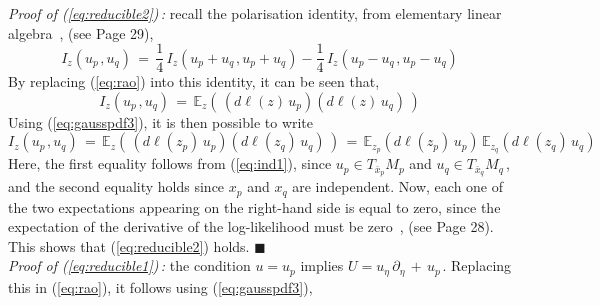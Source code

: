 \documentclass{svmult}
\begin{document}
\textit{Proof of (\ref{eq:reducible2})\,:} recall the polarisation identity, from elementary linear algebra~\cite{lang}, (see Page 29),
$$
I_z(u_{p\,},u_q) \,=\, \frac{1}{4}\,I_z(u_p+u_{q\,},u_p+u_q) -  \frac{1}{4}\,I_z(u_p-u_{q\,},u_p-u_{q})
$$
By replacing (\ref{eq:rao}) into this identity, it can be seen that,
\begin{equation} \label{eq:ind1}
I_z(u_{p\,},u_q) \,=\, \mathbb{E}_z\left(\,\left(d\ell(z)\,u_p\right)\left(d\ell(z)\,u_q\right)\,\right)
\end{equation}
Using (\ref{eq:gausspdf3}), it is then possible to write
$$
I_z(u_{p\,},u_q) \,=\, 
\mathbb{E}_z\left(\,\left(d\ell(z_p)\,u_p\right)\left(d\ell(z_q)\,u_q\right)\,\right) \,=\, \mathbb{E}_{z_p}\left(d\ell(z_p)\,u_p\right)\,
\mathbb{E}_{z_q}\left(d\ell(z_q)\,u_q\right)
$$
Here, the first equality follows from (\ref{eq:ind1}), since $u_p \in T_{\bar{x}_p}M_p$ and $u_q \in T_{\bar{x}_q}M_q\,$, and the second equality holds since $x_p$ and $x_q$ are independent. Now, each one of the two expectations appearing on the right-hand side is equal to zero, since the expectation of the derivative of the log-likelihood must be zero~\cite{amari}, (see Page 28). This shows that (\ref{eq:reducible2}) holds. \hfill$\blacksquare$ \\[0.1cm]
\textit{Proof of (\ref{eq:reducible1})\,:} the condition $u = u_p$ implies $U = u_\eta\,\partial_\eta\,+\, u_{p\,}$. Replacing this in (\ref{eq:rao}), it follows using (\ref{eq:gausspdf3}),
\end{document}
